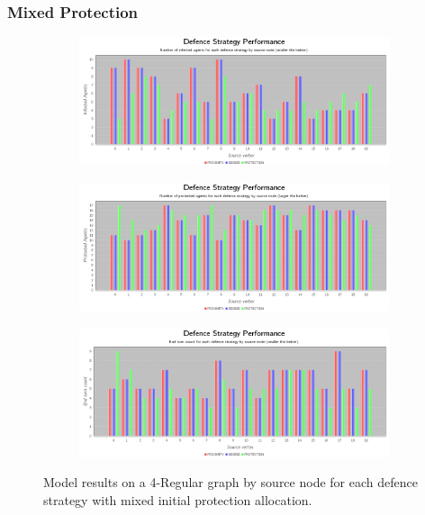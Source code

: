 \documentclass[results.tex]{subfiles}
\begin{document}
\newpage


\subsubsection{Mixed Protection}



\newpage

\begin{figure}[!ht]
\centering
     \begin{subfigure}[b]{0.9\textwidth}
         \centering
         \includegraphics[width=\textwidth]{Mixed/MixedInfectedChart}
         \label{fig:4reg-mix-infected}
     \end{subfigure}
     \vfill
     \begin{subfigure}[b]{0.9\textwidth}
         \centering
         \includegraphics[width=\textwidth]{Mixed/MixedProtectedChart}
         \label{fig:4reg-mix-protected}
     \end{subfigure}
     \vfill
     \begin{subfigure}[b]{0.9\textwidth}
         \centering
         \includegraphics[width=\textwidth]{Mixed/MixedEndTurnChart}
         \label{fig:4reg-mix-end}
     \end{subfigure}
        \caption{Model results on a 4-Regular graph by source node for each defence strategy with mixed initial protection allocation.}
        \label{fig:4reg-mix-charts}
\end{figure}
\end{document}
